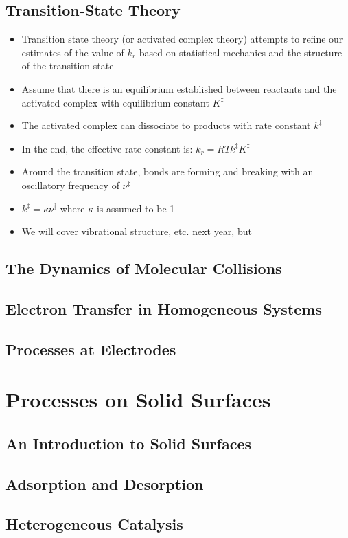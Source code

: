 \documentclass[12pt, openany, letterpaper]{memoir}
\begin{document}
\section{Transition-State Theory}
\begin{itemize}
	\item Transition state theory (or activated complex theory) attempts to refine our estimates of the value of $k_r$ based on statistical mechanics and the structure of the transition state
	\item Assume that there is an equilibrium established between reactants and the activated complex  with equilibrium constant $K^{\ddagger}$
	\item The activated complex can dissociate to products with rate constant $k^{\ddagger}$
	\item In the end, the effective rate constant is: $k_r=RTk^{\ddagger}K^{\ddagger}$
	\item Around the transition state, bonds are forming and breaking with an oscillatory frequency of $\nu^{\ddagger}$
	\item $k^{\ddagger}=\kappa\nu^{\ddagger}$ where $\kappa$ is assumed to be 1
	\item We will cover vibrational structure, etc. next year, but 
\end{itemize}
\section{The Dynamics of Molecular Collisions}

\section{Electron Transfer in Homogeneous Systems}

\section{Processes at Electrodes}

\chapter{Processes on Solid Surfaces}
\section{An Introduction to Solid Surfaces}

\section{Adsorption and Desorption}

\section{Heterogeneous Catalysis}
\end{document}
